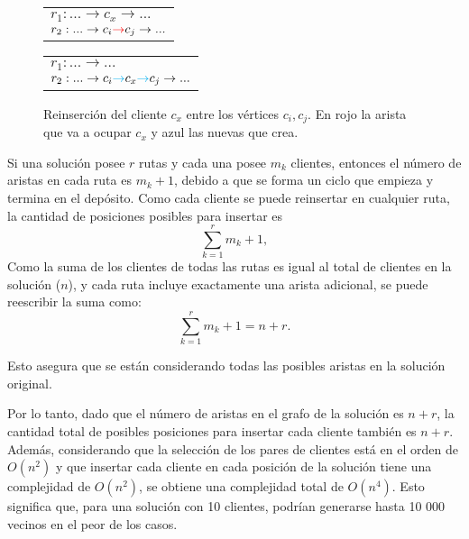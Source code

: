 \documentclass[12pt]{report}
\begin{document}
	\begin{figure}[h]
	\centering
	\begin{minipage}{0.45\textwidth}
			\begin{tabular}{l}
			$r_1: ... \rightarrow c_x \rightarrow ... $ \\
			$r_2: ... \rightarrow c_i \textcolor{red}{\rightarrow} c_j \rightarrow ... $ \\
		\end{tabular}
	\end{minipage}
		\begin{minipage}{0.45\textwidth}
		\begin{tabular}{l}
			$r_1: ... \rightarrow ... $ \\
			$r_2: ... \rightarrow c_i \textcolor{cyan}{\rightarrow} c_x \textcolor{cyan}{\rightarrow} c_j \rightarrow ... $ \\
		\end{tabular}
	\end{minipage}

	\caption{Reinserción del cliente $c_x$ entre los vértices $c_i,c_j$. En rojo la arista que va a ocupar $c_x$ y azul las nuevas que crea.}
	\label{fig:reinsertar_c_x}
\end{figure}


	Si una solución posee $r$ rutas y cada una posee $m_k$ clientes, entonces el número de aristas en cada ruta es $m_k+1$, debido a que se forma un ciclo que empieza y termina en el depósito. Como cada cliente se puede reinsertar en cualquier ruta, la cantidad de posiciones posibles para insertar es
	\[\sum \limits_{k=1} ^r m_k+1,\]
	Como la suma de los clientes de todas las rutas es igual al total de clientes en la solución ($n$), y cada ruta incluye exactamente una arista adicional, se puede reescribir la suma como:
	\[
	\sum \limits_{k=1} ^r m_k+1 = n+r.
	\]

	Esto asegura que se están considerando todas las posibles aristas en la solución original.

	Por lo tanto, dado que el número de aristas en el grafo de la solución es $n+r$, la cantidad total de posibles posiciones para insertar cada cliente también es $n+r$. Además, considerando que la selección de los pares de clientes está en el orden de $O(n^2)$ y que insertar cada cliente en cada posición de la solución tiene una complejidad de $O(n^2)$, se obtiene una complejidad total de $O(n^4)$. Esto significa que, para una solución con 10 clientes, podrían generarse hasta 10 000 vecinos en el peor de los casos.
\end{document}

